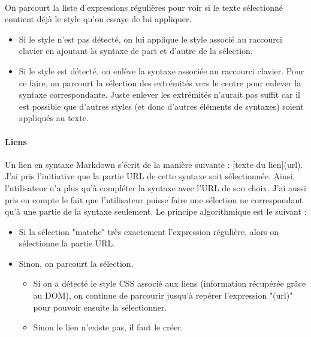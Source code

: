 \documentclass[12pt]{article}
\begin{document}
\paragraph{}
On parcourt la liste d'expressions régulières pour voir si le texte sélectionné contient déjà le style qu'on essaye de lui appliquer.
\begin{itemize}
    \item Si le style n'est pas détecté, on lui applique le style associé au raccourci clavier en ajoutant la syntaxe de part et d'autre de la sélection.
    \item Si le style est détecté, on enlève la syntaxe associée au raccourci clavier. Pour ce faire, on parcourt la sélection des extrémités vers le centre pour enlever la syntaxe correspondante. Juste enlever les extrémités n'aurait pas suffit car il est possible que d'autres styles (et donc d'autres éléments de syntaxes) soient appliqués au texte.
\end{itemize}

\paragraph{Liens}
Un lien en syntaxe Markdown s'écrit de la manière suivante : [texte du lien](url). J'ai pris l'initiative que la partie URL de cette syntaxe soit sélectionnée. Ainsi, l'utilisateur n'a plus qu'à compléter la syntaxe avec l'URL de son choix. J'ai aussi pris en compte le fait que l'utilisateur puisse faire une sélection ne correspondant qu'à une partie de la syntaxe seulement. Le principe algorithmique est le suivant :
\begin{itemize}
    \item Si la sélection "matche" très exactement l'expression régulière, alors on sélectionne la partie URL.
    \item Sinon, on parcourt la sélection.
        \begin{itemize}
            \item Si on a détecté le style CSS associé aux liens (information récupérée grâce au DOM), on continue de parcourir jusqu'à repérer l'expression "(url)" pour pouvoir ensuite la sélectionner.
            \item Sinon le lien n'existe pas, il faut le créer.
        \end{itemize}
\end{itemize}
\end{document}

